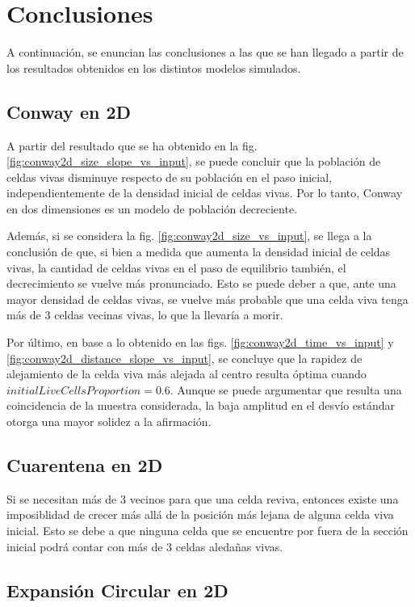 \section{Conclusiones}\label{sec:conclusiones}

A continuación, se enuncian las conclusiones a las que se han llegado a partir de los resultados obtenidos
en los distintos modelos simulados.

\subsection{Conway en 2D}\label{subsec:conway-en-2d-conc}
A partir del resultado que se ha obtenido en la fig. \ref{fig:conway2d_size_slope_vs_input}, se puede concluir
que la población de celdas vivas disminuye respecto de su población en el paso inicial, independientemente de
la densidad inicial de celdas vivas.
Por lo tanto, Conway en dos dimensiones es un modelo de población decreciente.

Además, si se considera la fig. \ref{fig:conway2d_size_vs_input}, se llega a la conclusión de que, si bien
a medida que aumenta la densidad inicial de celdas vivas, la cantidad de celdas vivas en el paso de equilibrio también,
el decrecimiento se vuelve más pronunciado.
Esto se puede deber a que, ante una mayor densidad de celdas vivas, se vuelve más probable que una celda viva
tenga más de 3 celdas vecinas vivas, lo que la llevaría a morir.

Por último, en base a lo obtenido en las figs. \ref{fig:conway2d_time_vs_input} y \ref{fig:conway2d_distance_slope_vs_input},
se concluye que la rapidez de alejamiento de la celda viva más alejada al centro resulta óptima cuando
$initialLiveCellsProportion = 0.6$.
Aunque se puede argumentar que resulta una coincidencia de la muestra considerada, la baja amplitud en el
desvío estándar otorga una mayor solidez a la afirmación.

\subsection{Cuarentena en 2D}\label{subsec:cuarentena-2D-conc}

Si se necesitan más de 3 vecinos para que una celda reviva, entonces existe una imposiblidad de crecer más allá de la posición más lejana
de alguna celda viva inicial. Esto se debe a que ninguna celda que se encuentre por fuera de la sección inicial podrá contar con más de
3 celdas aledañas vivas.

\subsection{Expansión Circular en 2D}\label{subsec:expansion-circular-2D-conc}

